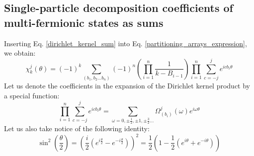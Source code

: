 \documentclass[12pt]{article}
\begin{document}
	\subsection{Single-particle decomposition coefficients of multi-fermionic states as sums}
	Inserting Eq. \ref{dirichlet_kernel_sum} into Eq. \ref{partitioning_arrays_expression}, we obtain:
	\begin{equation}
	\chi^j_k(\theta) = (-1)^k\sum_{(b_1, b_2\dots b_n)}(-1)^n\left(\prod_{i=1}^n \frac{1}{k-B_{i-1}}\right)\prod_{i=1}^n \sum_{c=-j}^j e^{icb_i\theta}
	\end{equation}
	Let us denote the coefficients in the expansion of the Dirichlet kernel product by a special function:
	\begin{equation} \label{omega_distribution_decomposition}
	\prod_{i=1}^n \sum_{c=-j}^j e^{icb_i\theta}=\sum_{\omega=0,\pm\frac{1}{2},\pm 1,\pm\frac{3}{2}\dots}\Omega^j_{(b_i)}(\omega)e^{i\omega\theta}
	\end{equation}
	Let us also take notice of the following identity:
	\begin{equation}
	\sin^2(\frac{\theta}{2})=\left(\frac{i}{2}\left(e^{i\frac{\theta}{2}}-e^{-i\frac{\theta}{2}}\right)\right)^2=\frac{1}{2}\left(1-\frac{1}{2}\left(e^{i\theta}+e^{-i\theta}\right)\right)
	\end{equation}
	
\end{document}
